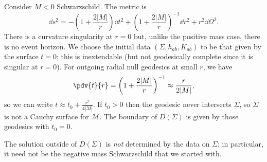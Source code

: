 \documentclass{jknotes}
\begin{document}
\begin{eg}
    Consider \(M<0\) Schwarzschild. The metric is
    \begin{equation}
        \dd{s}^2 = - \left(1+\frac{2|M|}{r}\right)\dd{t}^2 + \left(1+\frac{2|M|}{r}\right)^{-1}\dd{r}^2 + r^2\dd{\Omega}^2.
    \end{equation}
    There is a curvature singularity at \(r=0\) but, unlike the positive mass case, there is no event horizon. We choose the initial data \((\Sigma,h_{ab},K_{ab})\) to be that given by the surface \(t=0\); this is inextendable (but not geodesically complete since it is singular at \(r=0\)). For outgoing radial null geodesics at small \(r\), we have 
    \begin{equation}
        \pdv{t}{r} = \left(1+\frac{2|M|}{r}\right)^{-1} \approx \frac{r}{2|M|},
    \end{equation}
    so we can write \(t \approx t_0 + \frac{r^2}{4|M|}\). If \(t_0>0\) then the geodesic never intersects \(\Sigma\), so \(\Sigma\) is not a Cauchy surface for \(\mathcal{M}\). The boundary of \(D(\Sigma)\) is given by those geodesics with \(t_0=0\).
    \begin{figure}[H]
        \centering
    \end{figure}
    The solution outside of \(D(\Sigma)\) is \emph{not} determined by the data on \(\Sigma\); in particular, it need not be the negative mass Schwarzschild that we started with.
\end{eg}
\end{document}
